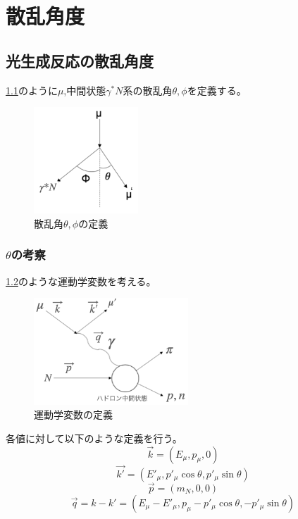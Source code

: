 \chapter{散乱角度}\label{cha:angle}
\section{光生成反応の散乱角度}
\ref{fig:angle1}のように$\mu$,中間状態$\gamma^*N$系の散乱角$\theta, \phi$を定義する。
\begin{figure}[H]
    \centering
    \includegraphics[height=4cm]{img/angle_diagram.png}
    \caption{散乱角$\theta, \phi$の定義}
    \label{fig:angle1}
\end{figure}

\subsection{$\theta$の考察}
\ref{fig:angle2}のような運動学変数を考える。
\begin{figure}[H]
    \centering
    \includegraphics[height=4cm]{img/diagram_3momentum.png}
    \caption{運動学変数の定義}
    \label{fig:angle2}
\end{figure}

各値に対して以下のような定義を行う。
\begin{equation}
    \vec{k} = (E_\mu , p_\mu,0)
\end{equation}
\begin{equation}
    \vec{k'} = (E'_\mu, p'_\mu \cos\theta, p'_\mu \sin\theta)
\end{equation}
\begin{equation}
    \vec{p} = (m_N, 0, 0)
\end{equation}
\begin{equation}
    \vec{q} = k-k'=(E_\mu - E'_\mu, p_\mu-p'_\mu \cos\theta, -p'_\mu \sin\theta)
\end{equation}

